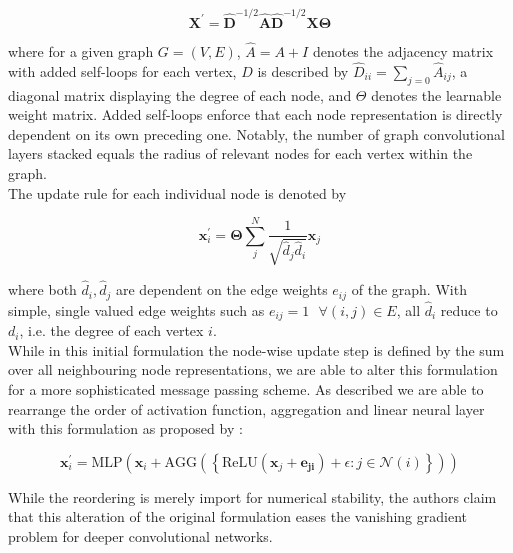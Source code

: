 \documentclass{bioinfo}
\begin{document}
\begin{equation}
	\mathbf{X}^{\prime} = \mathbf{\hat{D}}^{-1/2} \mathbf{\hat{A}}
	\mathbf{\hat{D}}^{-1/2} \mathbf{X} \mathbf{\Theta}
\end{equation}

where for a given graph $G=(V,E)$, $\hat{A} = A + I$ denotes the adjacency matrix with added self-loops for each vertex, $D$ is described by $\hat{D}_{ii} = \sum_{j=0} \hat{A}_{ij}$, a diagonal matrix displaying the degree of each node, and $\Theta$ denotes the learnable weight matrix. Added self-loops enforce that each node representation is directly dependent on its own preceding one. Notably, the number of graph convolutional layers stacked equals the radius of relevant nodes for each vertex within the graph.\\

The update rule for each individual node is denoted by 

\begin{equation}
	\mathbf{x}^{\prime}_i = \mathbf{\Theta} \sum^{N}_{j}
	\frac{1}{\sqrt{\hat{d}_j \hat{d}_i}} \mathbf{x}_j
\end{equation}

where both $\hat{d}_i, \hat{d}_j$ are dependent on the edge weights $e_{ij}$ of the graph. With simple, single valued edge weights such as $e_{ij}=1 \text{ }\forall (i,j)\in E$, all $\hat{d}_i$ reduce to $d_i$, i.e. the degree of each vertex $i$. \\

While in this initial formulation the node-wise update step is defined by the sum over all neighbouring node representations, we are able to alter this formulation for a more sophisticated message passing scheme. As described we are able to rearrange the order of activation function, aggregation and linear neural layer with this formulation as proposed by \citet{GENConv2020}:

\begin{equation}
	\mathbf{x}_i^{\prime} = \mathrm{MLP} \left( \mathbf{x}_i +
	\mathrm{AGG} \left( \left\{
	\mathrm{ReLU} \left( \mathbf{x}_j + \mathbf{e_{ji}} \right) +\epsilon
	: j \in \mathcal{N}(i) \right\} \right)
	\right)
\end{equation}

While the reordering is merely import for numerical stability, the authors claim that this alteration of the original formulation eases the vanishing gradient problem for deeper convolutional networks. \\
\end{document}
